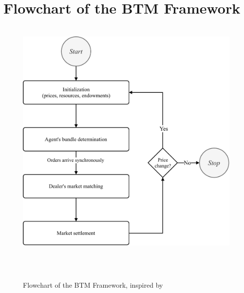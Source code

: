 \section{Flowchart of the BTM Framework}
\label{appendix:flowchart_btm}

\begin{figure}[htbp]
    \centering
    \includegraphics[width=0.8\linewidth]{./figures/btm_flowchart.pdf}
    \caption{Flowchart of the BTM Framework, inspired by \protect{}}
    \label{figure:btm_flowchart}
\end{figure}

\clearpage
